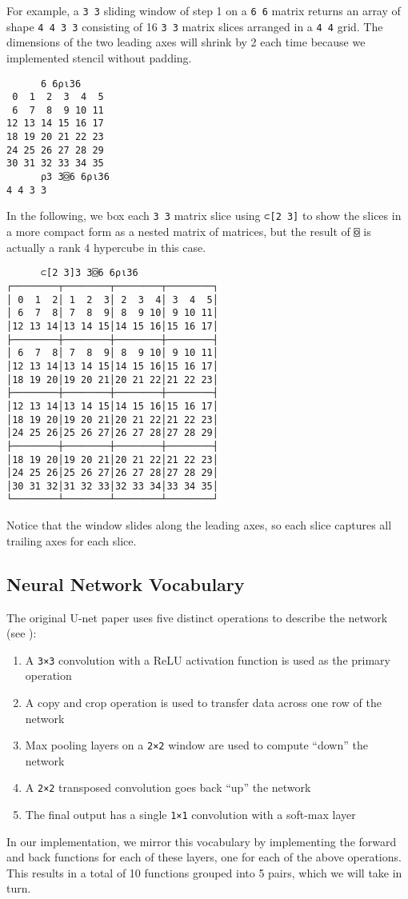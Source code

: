 \documentclass[10pt,twocolumn,english,format=sigplan,screen,balance]{acmart}
\begin{document}
For example, a \texttt{3 3} sliding window of step 1 on a \texttt{6
6} matrix returns an array of shape \texttt{4 4 3 3} consisting of
16 \texttt{3 3} matrix slices arranged in a \texttt{4 4} grid. The
dimensions of the two leading axes will shrink by 2 each time because
we implemented stencil without padding.
\begin{verbatim}
      6 6⍴⍳36
 0  1  2  3  4  5
 6  7  8  9 10 11
12 13 14 15 16 17
18 19 20 21 22 23
24 25 26 27 28 29
30 31 32 33 34 35
      ⍴3 3⌺6 6⍴⍳36
4 4 3 3
\end{verbatim}
In the following, we box each \texttt{3 3} matrix slice using \texttt{⊂{[}2
3{]}} to show the slices in a more compact form as a nested matrix
of matrices, but the result of \texttt{⌺} is actually a rank 4 hypercube
in this case.
\begin{verbatim}
      ⊂[2 3]3 3⌺6 6⍴⍳36
┌────────┬────────┬────────┬────────┐
│ 0  1  2│ 1  2  3│ 2  3  4│ 3  4  5│
│ 6  7  8│ 7  8  9│ 8  9 10│ 9 10 11│
│12 13 14│13 14 15│14 15 16│15 16 17│
├────────┼────────┼────────┼────────┤
│ 6  7  8│ 7  8  9│ 8  9 10│ 9 10 11│
│12 13 14│13 14 15│14 15 16│15 16 17│
│18 19 20│19 20 21│20 21 22│21 22 23│
├────────┼────────┼────────┼────────┤
│12 13 14│13 14 15│14 15 16│15 16 17│
│18 19 20│19 20 21│20 21 22│21 22 23│
│24 25 26│25 26 27│26 27 28│27 28 29│
├────────┼────────┼────────┼────────┤
│18 19 20│19 20 21│20 21 22│21 22 23│
│24 25 26│25 26 27│26 27 28│27 28 29│
│30 31 32│31 32 33│32 33 34│33 34 35│
└────────┴────────┴────────┴────────┘
\end{verbatim}
Notice that the window slides along the leading axes, so each slice
captures all trailing axes for each slice.

\subsection{Neural Network Vocabulary\label{subsec:Neural-Network-Vocabulary}}

The original U-net paper uses five distinct operations to describe
the network (see ):
\begin{enumerate}
\item A \texttt{3×3} convolution with a ReLU activation function is used
as the primary operation
\item A copy and crop operation is used to transfer data across one row
of the network
\item Max pooling layers on a \texttt{2×2} window are used to compute “down”
the network
\item A \texttt{2×2} transposed convolution goes back “up” the network
\item The final output has a single \texttt{1×1} convolution with a soft-max
layer
\end{enumerate}
In our implementation, we mirror this vocabulary by implementing the
forward and back functions for each of these layers, one for each
of the above operations. This results in a total of 10 functions grouped
into 5 pairs, which we will take in turn.
\end{document}
